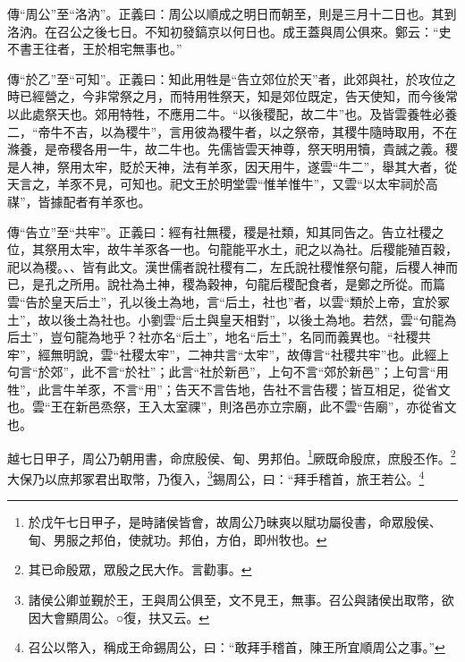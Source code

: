 {\noindent\zhuan{}\fzbyks 傳“周公”至“洛汭”。正義曰：周公以順成之明日而朝至，則是三月十二日也。其到洛汭。在召公之後七日。不知初發鎬京以何日也。成王蓋與周公俱來。鄭云：“史不書王往者，王於相宅無事也。” \par}

{\noindent\zhuan{}\fzbyks 傳“於乙”至“可知”。正義曰：知此用牲是“告立郊位於天”者，此郊與社，於攻位之時已經營之，今非常祭之月，而特用牲祭天，知是郊位既定，告天使知，而今後常以此處祭天也。郊用特牲，不應用二牛。“以後稷配，故二牛”也。及皆雲養牲必養二，“帝牛不吉，以為稷牛”，言用彼為稷牛者，以之祭帝，其稷牛隨時取用，不在滌養，是帝稷各用一牛，故二牛也。先儒皆雲天神尊，祭天明用犢，貴誠之義。稷是人神，祭用太牢，貶於天神，法有羊豕，因天用牛，遂雲“牛二”，舉其大者，從天言之，羊豕不見，可知也。祀文王於明堂雲“惟羊惟牛”，又雲“以太牢祠於高禖”，皆據配者有羊豕也。 \par}

{\noindent\zhuan{}\fzbyks 傳“告立”至“共牢”。正義曰：經有社無稷，稷是社類，知其同告之。告立社稷之位，其祭用太牢，故牛羊豕各一也。句龍能平水土，祀之以為社。后稷能殖百穀，祀以為稷。、、皆有此文。漢世儒者說社稷有二，左氏說社稷惟祭句龍，后稷人神而已，是孔之所用。說社為土神，稷為穀神，句龍后稷配食者，是鄭之所從。而篇雲“告於皇天后土”，孔以後土為地，言“后土，社也”者，以雲“類於上帝，宜於冢土”，故以後土為社也。小劉雲“后土與皇天相對”，以後土為地。若然，雲“句龍為后土”，豈句龍為地乎？社亦名“后土”，地名“后土”，名同而義異也。“社稷共牢”，經無明說，雲“社稷太牢”，二神共言“太牢”，故傳言“社稷共牢”也。此經上句言“於郊”，此不言“於社”；此言“社於新邑”，上句不言“郊於新邑”；上句言“用牲”，此言牛羊豕，不言“用”；告天不言告地，告社不言告稷；皆互相足，從省文也。雲“王在新邑烝祭，王入太室祼”，則洛邑亦立宗廟，此不雲“告廟”，亦從省文也。 \par}

越七日甲子，周公乃朝用書，命庶殷侯、甸、男邦伯。\footnote{於戊午七日甲子，是時諸侯皆會，故周公乃昧爽以賦功屬役書，命眾殷侯、甸、男服之邦伯，使就功。邦伯，方伯，即州牧也。}厥既命殷庶，庶殷丕作。\footnote{其已命殷眾，眾殷之民大作。言勸事。}大保乃以庶邦冢君出取幣，乃復入，\footnote{諸侯公卿並覲於王，王與周公俱至，文不見王，無事。召公與諸侯出取幣，欲因大會顯周公。○復，扶又云。}錫周公，曰：“拜手稽首，旅王若公。\footnote{召公以幣入，稱成王命錫周公，曰：“敢拜手稽首，陳王所宜順周公之事。”}

